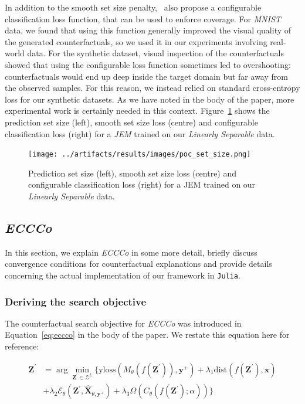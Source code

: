 In addition to the smooth set size penalty,~\citet{stutz2022learning} also propose a configurable classification loss function, that can be used to enforce coverage. For \textit{MNIST} data, we found that using this function generally improved the visual quality of the generated counterfactuals, so we used it in our experiments involving real-world data. For the synthetic dataset, visual inspection of the counterfactuals showed that using the configurable loss function sometimes led to overshooting: counterfactuals would end up deep inside the target domain but far away from the observed samples. For this reason, we instead relied on standard cross-entropy loss for our synthetic datasets. As we have noted in the body of the paper, more experimental work is certainly needed in this context. Figure~\ref{fig:cp-diff} shows the prediction set size (left), smooth set size loss (centre) and configurable classification loss (right) for a \textit{JEM} trained on our \textit{Linearly Separable} data.

\begin{figure}
  \centering
  \texttt{[image: ../artifacts/results/images/poc\_set\_size.png]}
  \caption{Prediction set size (left), smooth set size loss (centre) and configurable classification loss (right) for a JEM trained on our \textit{Linearly Separable} data.}\label{fig:cp-diff}
\end{figure}

\subsection{\textit{ECCCo}}\label{app:eccco}

In this section, we explain \textit{ECCCo} in some more detail, briefly discuss convergence conditions for counterfactual explanations and provide details concerning the actual implementation of our framework in \texttt{Julia}.  

\subsubsection{Deriving the search objective} 

The counterfactual search objective for \textit{ECCCo} was introduced in Equation~\ref{eq:eccco} in the body of the paper. We restate this equation here for reference:

\begin{equation} \label{eq:eccco-app}
  \begin{aligned}
  \mathbf{Z}^\prime &= \arg \min_{\mathbf{Z}^\prime \in \mathcal{Z}^L} \{  {\text{yloss}(M_{\theta}(f(\mathbf{Z}^\prime)),\mathbf{y}^+)}+ \lambda_{1} {\text{dist}(f(\mathbf{Z}^\prime),\mathbf{x}) } \\
  &+ \lambda_2 \mathcal{E}_{\theta}(\mathbf{Z}^\prime,\widehat{\mathbf{X}}_{\theta,\mathbf{y}^+}) + \lambda_3 \Omega(C_{\theta}(f(\mathbf{Z}^\prime);\alpha)) \} 
  \end{aligned} 
\end{equation}

